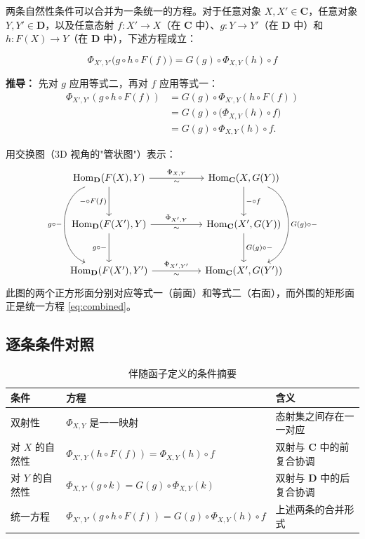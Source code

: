 \documentclass[12pt,a4paper]{ctexart}
\theoremstyle{definition}
\newcommand{\cat}[1]{\mathbf{#1}}
\newcommand{\Hom}{\mathrm{Hom}}
\begin{document}
两条自然性条件可以合并为一条统一的方程。对于任意对象 $X, X' \in \cat{C}$，任意对象 $Y, Y' \in \cat{D}$，以及任意态射 $f: X' \to X$（在 $\cat{C}$ 中）、$g: Y \to Y'$（在 $\cat{D}$ 中）和 $h: F(X) \to Y$（在 $\cat{D}$ 中），下述方程成立：

\begin{equation}\label{eq:combined}
\boxed{\; \Phi_{X',Y'}\!\bigl(g \circ h \circ F(f)\bigr) = G(g) \circ \Phi_{X,Y}(h) \circ f \;}
\end{equation}

\textbf{推导：} 先对 $g$ 应用等式二，再对 $f$ 应用等式一：
\begin{align*}
\Phi_{X',Y'}(g \circ h \circ F(f))
&= G(g) \circ \Phi_{X',Y}(h \circ F(f)) \tag{等式二}\\
&= G(g) \circ \bigl(\Phi_{X,Y}(h) \circ f\bigr) \tag{等式一}\\
&= G(g) \circ \Phi_{X,Y}(h) \circ f.
\end{align*}

用交换图（3D 视角的"管状图"）表示：
{\small\[
\begin{tikzcd}[column sep=5em, row sep=3em]
\Hom_{\cat{D}}(F(X), Y) \arrow[r,"\Phi_{X,Y}","\sim"'] \arrow[d,"-\circ F(f)"'] \arrow[dd, bend right=70, "g\circ-"'] &
\Hom_{\cat{C}}(X, G(Y)) \arrow[d,"-\circ f"] \arrow[dd, bend left=70, "G(g)\circ-"] \\
\Hom_{\cat{D}}(F(X'), Y) \arrow[r,"\Phi_{X',Y}","\sim"'] \arrow[d,"g\circ-"'] &
\Hom_{\cat{C}}(X', G(Y)) \arrow[d,"G(g)\circ-"] \\
\Hom_{\cat{D}}(F(X'), Y') \arrow[r,"\Phi_{X',Y'}","\sim"'] &
\Hom_{\cat{C}}(X', G(Y'))
\end{tikzcd}
\]}
此图的两个正方形面分别对应等式一（前面）和等式二（右面），而外围的矩形面正是统一方程 \eqref{eq:combined}。

\subsection{逐条条件对照}

\begin{table}[h]
\centering
\caption{伴随函子定义的条件摘要}
\begin{tabular}{@{}l|l|l@{}}
\toprule
\textbf{条件} & \textbf{方程} & \textbf{含义} \\
\midrule
双射性 & $\Phi_{X,Y}$ 是一一映射 & 态射集之间存在一一对应 \\
对 $X$ 的自然性 & $\Phi_{X',Y}(h \circ F(f)) = \Phi_{X,Y}(h) \circ f$ & 双射与 $\cat{C}$ 中的前复合协调 \\
对 $Y$ 的自然性 & $\Phi_{X,Y'}(g \circ k) = G(g) \circ \Phi_{X,Y}(k)$ & 双射与 $\cat{D}$ 中的后复合协调 \\
统一方程 & $\Phi_{X',Y'}(g \circ h \circ F(f)) = G(g) \circ \Phi_{X,Y}(h) \circ f$ & 上述两条的合并形式 \\
\bottomrule
\end{tabular}
\end{table}
\end{document}
